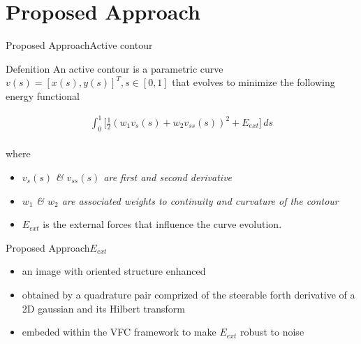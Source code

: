 \documentclass[10pt]{beamer}
\begin{document}
\section{Proposed Approach}
\begin{frame}{Proposed Approach}{Active contour} 
\begin{block}{Defenition}
	An active contour is a parametric curve $v(s) = [x(s) ,y(s)]^T , s \in [0,1]$ that evolves to
	minimize the following energy functional 
	
	\vspace{5pt}
	\begin{gather} 
	\int_{0}^{1} \Big[\frac{1}{2} (w_{1}v_{s}(s) + w_{2}v_{ss}(s))^2 + E_{ext} \Big] \, ds	
	\end{gather}
	\vspace{5pt}
	\\where \\
	\begin{itemize}
		\item $v_{s}(s)$ \em\& $v_{ss}(s)$ are first and second derivative
		\item $w_{1} $ \em\& $w_{2}$ are associated weights to continuity and curvature of the contour
		\item $E_{ext}$ is the external forces that influence the curve evolution.
\end{itemize}
\end{block}
\end{frame}

\begin{frame}{Proposed Approach}{$E_{ext}$} 
\begin{itemize}
	\item an image with oriented structure enhanced
	\item obtained by a quadrature pair comprized of the steerable forth derivative of a 2D gaussian and its Hilbert transform
	\item embeded within the VFC framework to make $E_{ext}$ robust to noise
\end{itemize}
\end{frame}
\end{document}
